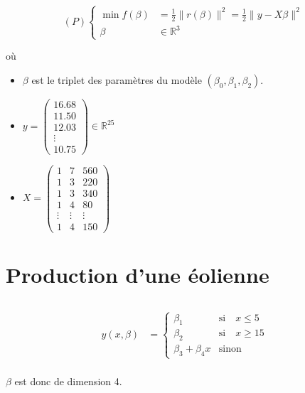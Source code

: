 \documentclass{article}
\begin{document}
\[
	(P) \begin{cases}
		\min f(\beta) &= \frac{1}{2} \|r(\beta)\|^2 = \frac{1}{2} \|y-X\beta\|^2 \\
		\beta &\in \mathbb{R}^3
	\end{cases}
\] 

où

\begin{itemize}
	\item $\beta$ est le triplet des paramètres du modèle $(\beta_0, \beta_1, \beta_2)$.
	\item $y = \begin{pmatrix} 16.68 \\ 11.50 \\ 12.03 \\ \vdots \\ 10.75 \end{pmatrix} \in \mathbb{R}^{25}$
	\item $X = \begin{pmatrix} 1 & 7 & 560 \\ 1 & 3 & 220 \\ 1 & 3 & 340 \\ 1 & 4 & 80 \\ \vdots & \vdots & \vdots \\ 1 & 4 & 150 \end{pmatrix} $
\end{itemize}

\section{Production d'une éolienne}

\subsection{}

\begin{align*}
	y(x, \beta) &= \begin{cases}
		\beta_1 &\text{si}\quad x \le 5 \\
		\beta_2 &\text{si}\quad x\ge 15 \\
		\beta_3 + \beta_4x &\text{sinon}
	\end{cases} \\
\end{align*}

$\beta$ est donc de dimension 4.

\subsection{}
\end{document}
